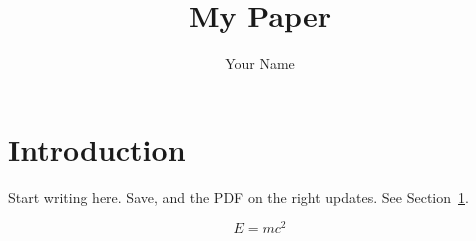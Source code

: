 \documentclass[11pt]{article}
\title{My Paper}
\author{Your Name}
\begin{document}
\maketitle

\section{Introduction}\label{sec:intro}
Start writing here. Save, and the PDF on the right updates. See Section~\ref{sec:intro}.

\begin{equation}
  E = mc^2
\end{equation}
\end{document}
